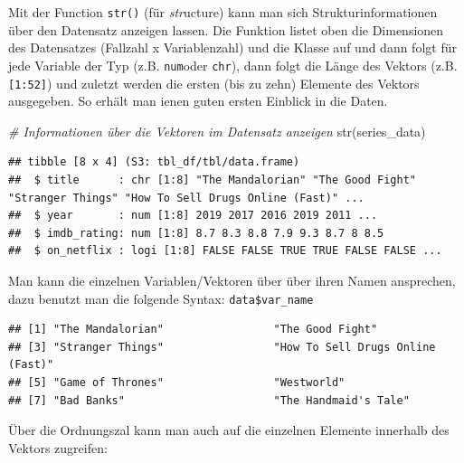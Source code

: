 \documentclass[
]{book}
\newenvironment{Shaded}{\begin{snugshade}}{\end{snugshade}}
\newcommand{\CommentTok}[1]{\textcolor[rgb]{0.56,0.35,0.01}{\textit{#1}}}
\newcommand{\DecValTok}[1]{\textcolor[rgb]{0.00,0.00,0.81}{#1}}
\newcommand{\FunctionTok}[1]{\textcolor[rgb]{0.00,0.00,0.00}{#1}}
\newcommand{\NormalTok}[1]{#1}
\newcommand{\SpecialCharTok}[1]{\textcolor[rgb]{0.00,0.00,0.00}{#1}}
\begin{document}
Mit der Function \texttt{str()} (für \emph{str}ucture) kann man sich Strukturinformationen über den Datensatz anzeigen lassen. Die Funktion listet oben die Dimensionen des Datensatzes (Fallzahl x Variablenzahl) und die Klasse auf und dann folgt für jede Variable der Typ (z.B. \texttt{num}oder \texttt{chr}), dann folgt die Länge des Vektors (z.B. \texttt{{[}1:52{]}}) und zuletzt werden die ersten (bis zu zehn) Elemente des Vektors ausgegeben. So erhält man ienen guten ersten Einblick in die Daten.

\begin{Shaded}
\begin{Highlighting}[]
\CommentTok{\# Informationen über die Vektoren im Datensatz anzeigen}
\FunctionTok{str}\NormalTok{(series\_data)}
\end{Highlighting}
\end{Shaded}

\begin{verbatim}
## tibble [8 x 4] (S3: tbl_df/tbl/data.frame)
##  $ title      : chr [1:8] "The Mandalorian" "The Good Fight" "Stranger Things" "How To Sell Drugs Online (Fast)" ...
##  $ year       : num [1:8] 2019 2017 2016 2019 2011 ...
##  $ imdb_rating: num [1:8] 8.7 8.3 8.8 7.9 9.3 8.7 8 8.5
##  $ on_netflix : logi [1:8] FALSE FALSE TRUE TRUE FALSE FALSE ...
\end{verbatim}

Man kann die einzelnen Variablen/Vektoren über über ihren Namen ansprechen, dazu benutzt man die folgende Syntax: \texttt{data\$var\_name}

\begin{Shaded}
\end{Shaded}

\begin{verbatim}
## [1] "The Mandalorian"                 "The Good Fight"                 
## [3] "Stranger Things"                 "How To Sell Drugs Online (Fast)"
## [5] "Game of Thrones"                 "Westworld"                      
## [7] "Bad Banks"                       "The Handmaid's Tale"
\end{verbatim}

Über die Ordnungszal kann man auch auf die einzelnen Elemente innerhalb des Vektors zugreifen:

\begin{Shaded}
\end{Shaded}
\end{document}
